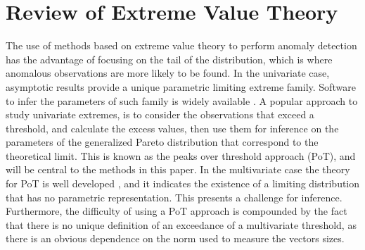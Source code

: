     \section{Review of Extreme Value Theory\label{sec:evt}}

The use of methods based on extreme value theory to perform anomaly detection
    has the advantage of focusing on the tail of the distribution, which is 
    where anomalous observations are more likely to be found. In the univariate 
    case, asymptotic results provide a unique parametric limiting extreme 
    family. Software to infer the parameters of such family is widely available 
    \cite[see, for example,][]{coles2001}. A popular approach to study 
    univariate extremes, is to consider the observations  that exceed a 
    threshold, and calculate the excess values, then use them for inference on 
    the parameters of the generalized Pareto distribution that correspond to 
    the theoretical limit. This is known as  the peaks over threshold approach 
    (PoT), and will be central to the methods in this paper. In the multivariate 
    case the theory for PoT is well developed 
    \citep[see, for example][]{dehaan2006}, and it indicates the existence of a 
    limiting  distribution  that has no parametric representation. This 
    presents a challenge for inference. Furthermore, the difficulty of using a 
    PoT approach is compounded by the fact  that there is no unique definition 
    of an exceedance of a multivariate threshold, as there is an obvious 
    dependence on the norm used to measure the vectors sizes.

